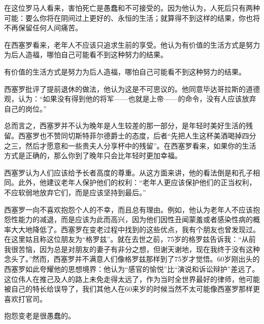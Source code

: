 在这位罗马人看来，害怕死亡是愚蠢和不可接受的。因为他认为，人死后只有两种可能：要么你将在阴间过上更好的、永恒的生活；就算得不到这样的结果，你也将不再保留任何人间痛苦。
\par

在西塞罗看来，老年人不应该只追求生前的享受。他认为有价值的生活方式是努力为后人造福，哪怕自己可能看不到这种努力的结果。
\par

\begin{WisdomBox}
\par

有价值的生活方式是努力为后人造福，哪怕自己可能看不到这种努力的结果。
\par
\end{WisdomBox}

西塞罗批评了提前退休的做法，他认为这是不可思议的。他同意毕达哥拉斯的道德观，认为：“如果没有得到他的将军——也就是上帝——的命令，没有人应该放弃自己的岗位。”
\par

总而言之，西塞罗并不认为晚年是人生较差的那一部分，是年轻时美好生活的残留。西塞罗也不赞同切斯特菲尔德爵士的态度，后者“先把人生这杯美酒喝掉四分之三，然后才愿意和一些贵夫人分享杯中的残留”。在西塞罗看来，如果你的生活方式是正确的，那么你到了晚年只会比年轻时更加幸福。
\par

西塞罗认为人们应该给予长者高度的尊重。从这方面来讲，他的看法倒是和孔子相同。此外，他建议老年人保护他们的权利：“老年人更应该保护他们的正当权利，不应软弱地放弃它们，而是应该坚持到最后。”
\par

西塞罗一向不喜欢抱怨个人的不幸，而且总有理由。例如，他认为老年人不应该抱怨性能力的减退，而是应该为此而高兴，因为他们因性丑闻蒙羞或者感染性病的概率大大地降低了。西塞罗在变老过程中找到的这些优点，我有个朋友也曾发现过。在这里姑且称这位朋友为“格罗兹”。就在去世之前，75岁的格罗兹告诉我：“从前我很苦恼，因为总是对朋友的妻子有非分之想，但谢天谢地，现在我终于没有这种念头了。”然而，西塞罗并不满意人们像格罗兹那样到了75岁才觉悟。60岁刚出头的西塞罗如此夸耀他的思想境界：他认为“感官的愉悦”比“演说和诉讼辩护”差远了。这位伟人在推己及人的路上未免走得太远了，作为当时全世界最好的律师，他可能被自己的特长给误导了，我们其他人在60来岁的时候当然不太可能像西塞罗那样更喜欢打官司。
\par

\begin{WisdomBox}
\par

抱怨变老是很愚蠢的。
\par
\end{WisdomBox}

